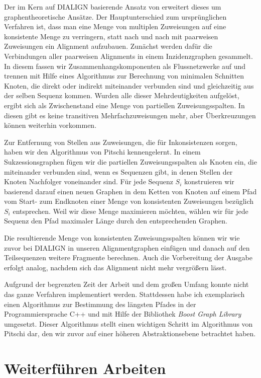 Der im Kern auf DIALIGN basierende Ansatz von \cite{cpm10} erweitert dieses um graphentheoretische Ansätze. Der Hauptunterschied zum ursprünglichen Verfahren ist, dass man eine Menge von multiplen Zuweisungen auf eine konsistente Menge zu verringern, statt nach und nach mit paarweisen Zuweisungen ein Alignment aufzubauen. Zunächst werden dafür die Verbindungen aller paarweisen Alignments in einem Inzidenzgraphen gesammelt. In diesem fassen wir Zusammenhangskomponenten als Flussnetzwerke auf und trennen mit Hilfe eines Algorithmus zur Berechnung von minimalen Schnitten Knoten, die direkt oder indirekt miteinander verbunden sind und gleichzeitig aus der selben Sequenz kommen. Wurden alle dieser Mehrdeutigkeiten aufgelöst, ergibt sich als Zwischenstand eine Menge von partiellen Zuweisungsspalten. In diesen gibt es keine transitiven Mehrfachzuweisungen mehr, aber Überkreuzungen können weiterhin vorkommen. 

Zur Entfernung von Stellen aus Zuweisungen, die für Inkonsistenzen sorgen, haben wir den Algorithmus von Pitschi kennengelernt. In einem Sukzessionsgraphen fügen wir die partiellen Zuweisungsspalten als Knoten ein, die miteinander verbunden sind, wenn es Sequenzen gibt, in denen Stellen der Knoten Nachfolger voneinander sind. Für jede Sequenz $S_i$ konstruieren wir basierend darauf einen neuen Graphen in dem Ketten von Knoten auf einem Pfad vom Start- zum Endknoten einer Menge von konsistenten Zuweisungen bezüglich $S_i$ entsprechen. Weil wir diese Menge maximieren möchten, wählen wir für jede Sequenz den Pfad maximaler Länge durch den entsprechenden Graphen.

Die resultierende Menge von konsistenten Zuweisungsspalten können wir wie zuvor bei DIALIGN in unseren Alignmentgraphen einfügen und danach auf den Teilsequenzen weitere Fragmente berechnen. Auch die Vorbereitung der Ausgabe erfolgt analog, nachdem sich das Alignment nicht mehr vergrößern lässt.

Aufgrund der begrenzten Zeit der Arbeit und dem großen Umfang konnte nicht das ganze Verfahren implementiert werden. Stattdessen habe ich exemplarisch einen Algorithmus zur Bestimmung des längsten Pfades in der Programmiersprache C++ und mit Hilfe der Bibliothek \emph{Boost Graph Library} umgesetzt. Dieser Algorithmus stellt einen wichtigen Schritt im Algorithmus von Pitschi dar, den wir zuvor auf einer höheren Abstraktionsebene betrachtet haben. 

\section{Weiterführen Arbeiten} \label{sec:fut_work}

